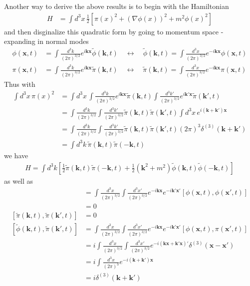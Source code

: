 \documentclass{article}
\begin{document}
Another way to derive the above results is to begin with the Hamiltonian
\begin{align}
H&=\int d^3x\,\frac{1}{2}[\pi(x)^2+(\nabla\phi(x))^2+m^2\phi(x)^2]
\end{align}
and then disginalize this quadratic form by going to momentum space - expanding in normal modes
\begin{align}
\label{eqn:phixtFourier}
\phi(\mathbf{x},t)&=\int\frac{d^3k}{(2\pi)^{3/2}}e^{i\mathbf{kx}}\tilde\phi(\mathbf{k},t)
\quad\leftrightarrow\quad
\tilde\phi(\mathbf{k},t)=\int\frac{d^3x}{(2\pi)^{3/2}}e^{-i\mathbf{kx}}\phi(\mathbf{x},t)\\
\pi(\mathbf{x},t)&=\int\frac{d^3k}{(2\pi)^{3/2}}e^{i\mathbf{kx}}\tilde\pi(\mathbf{k},t)
\quad\leftrightarrow\quad
\tilde\pi(\mathbf{k},t)=\int\frac{d^3x}{(2\pi)^{3/2}}e^{-i\mathbf{kx}}\pi(\mathbf{x},t)
\end{align}
Thus with
\begin{align}
\int d^3x\,\pi(x)^2
&=\int d^3x\,\int\frac{d^3k}{(2\pi)^{3/2}}e^{i\mathbf{kx}}\tilde\pi(\mathbf{k},t)\int\frac{d^3k'}{(2\pi)^{3/2}}e^{i\mathbf{k'x}}\tilde\pi(\mathbf{k}',t)\\
&=\int\frac{d^3k}{(2\pi)^{3/2}}\int\frac{d^3k'}{(2\pi)^{3/2}}\tilde\pi(\mathbf{k},t)\tilde\pi(\mathbf{k}',t)\int d^3x\,e^{i\mathbf{(k+k')x}}\\
&=\int\frac{d^3k}{(2\pi)^{3/2}}\int\frac{d^3k'}{(2\pi)^{3/2}}\tilde\pi(\mathbf{k},t)\tilde\pi(\mathbf{k}',t)(2\pi)^3\delta^{(3)}(\mathbf{k+k'})\\
&=\int d^3k\,\tilde\pi(\mathbf{k},t)\tilde\pi(-\mathbf{k},t)
\end{align}
we have
\begin{align}
H=\int d^3k\left[\frac{1}{2}\tilde{\pi}(\mathbf{k},t)\tilde{\pi}(-\mathbf{k},t)+\frac{1}{2}(\mathbf{k}^2+m^2)\tilde{\phi}(\mathbf{k},t)\tilde{\phi}(-\mathbf{k},t)\right]
\end{align}
as well as
\begin{align}
[\tilde\phi(\mathbf{k},t),\tilde\phi(\mathbf{k}',t)]
&=\int\frac{d^3x}{(2\pi)^{3/2}}\int\frac{d^3x'}{(2\pi)^{3/2}}e^{-i\mathbf{kx}}e^{-i\mathbf{k'x'}}[\phi(\mathbf{x},t),\phi(\mathbf{x}',t)]\\
&=0\\
[\tilde\pi(\mathbf{k},t),\tilde\pi(\mathbf{k}',t)]
&=0\\
[\tilde\phi(\mathbf{k},t),\tilde\pi(\mathbf{k}',t)]
&=\int\frac{d^3x}{(2\pi)^{3/2}}\int\frac{d^3x'}{(2\pi)^{3/2}}e^{-i\mathbf{kx}}e^{-i\mathbf{k'x'}}[\phi(\mathbf{x},t),\pi(\mathbf{x}',t)]\\
&=i\int\frac{d^3x}{(2\pi)^{3/2}}\int\frac{d^3x'}{(2\pi)^{3/2}}e^{-i\mathbf{(kx+k'x)'}}\delta^{(3)}(\mathbf{x-x'})\\
&=i\int\frac{d^3x}{(2\pi)^{3}}e^{-i\mathbf{(k+k')x}}\\
&=i\delta^{(3)}(\mathbf{k+k'})
\end{align}
\end{document}
